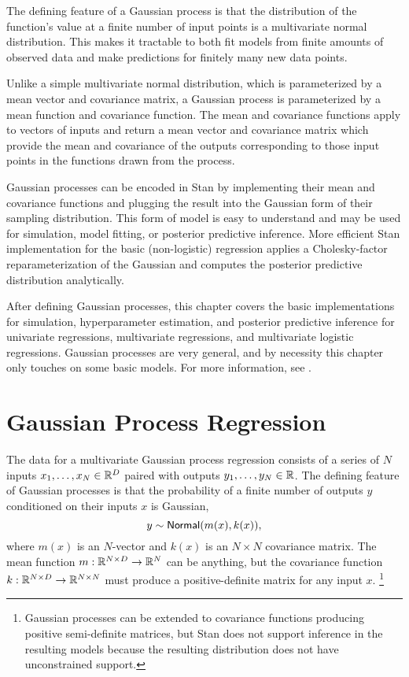 The defining feature of a Gaussian process is that the distribution of
the function's value at a finite number of input points is a
multivariate normal distribution.  This makes it tractable to both fit
models from finite amounts of observed data and make predictions for
finitely many new data points. 

Unlike a simple multivariate normal distribution, which is
parameterized by a mean vector and covariance matrix, a Gaussian
process is parameterized by a mean function and covariance function.
The mean and covariance functions apply to vectors of inputs and
return a mean vector and covariance matrix which provide the mean and
covariance of the outputs corresponding to those input points in the
functions drawn from the process.

Gaussian processes can be encoded in Stan by implementing their mean
and covariance functions and plugging the result into the Gaussian
form of their sampling distribution.  This form of model is easy to
understand and may be used for simulation, model fitting, or posterior
predictive inference.  More efficient Stan implementation for the
basic (non-logistic) regression applies a Cholesky-factor
reparameterization of the Gaussian and computes the posterior
predictive distribution analytically.

After defining Gaussian processes, this chapter covers the basic
implementations for simulation, hyperparameter estimation, and
posterior predictive inference for univariate regressions,
multivariate regressions, and multivariate logistic regressions.
Gaussian processes are very general, and by necessity this chapter
only touches on some basic models.  For more information, see
\citep{RasmussenWilliams:2006}.


\section{Gaussian Process Regression}

The data for a multivariate Gaussian process regression consists of a
series of $N$ inputs $x_1,\ldots,x_N \in \mathbb{R}^D$ paired with outputs
$y_1,\ldots,y_N \in \mathbb{R}$.  The defining feature of Gaussian
processes is that the probability of a finite number of outputs $y$
conditioned on their inputs $x$ is Gaussian,
\[
y \sim \mbox{\sf Normal}(m(x),k(x)),
\] 
where $m(x)$ is an $N$-vector and $k(x)$ is an $N \times N$
covariance matrix.  The mean function $m : \mathbb{R}^{N \times D}
\rightarrow \mathbb{R}^{N}$ can be anything, but the covariance function
$k : \mathbb{R}^{N \times D} \rightarrow \mathbb{R}^{N \times N}$ must produce
a positive-definite matrix for any input $x$.%
%
\footnote{Gaussian processes can be extended to covariance functions
  producing positive semi-definite matrices, but Stan does not support
  inference in the resulting models because the resulting distribution
  does not have unconstrained support.}

